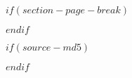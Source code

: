 \usepackage{bold-extra}
\usepackage[perpage,symbol*]{footmisc}

$if(section-page-break)$
\usepackage{titlesec}
$endif$

$if(source-md5)$
$endif$
